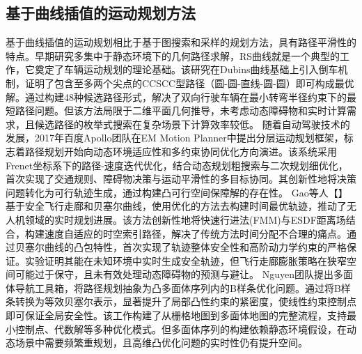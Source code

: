 \documentclass[master,academic]{ysuthesis} %
\begin{document}
		\subsection{基于曲线插值的运动规划方法}
		基于曲线插值的运动规划相比于基于图搜索和采样的规划方法，具有路径平滑性的特点。早期研究多集中于静态环境下的几何路径求解，RS曲线就是一个典型的工作，它奠定了车辆运动规划的理论基础。该研究在Dubins曲线基础上引入倒车机制，证明了包含至多两个尖点的CCSCC型路径（圆-圆-直线-圆-圆）即可构成最优解。通过构建48种候选路径形式，解决了双向行驶车辆在最小转弯半径约束下的最短路径问题。但该方法局限于二维平面几何推导，未考虑动态障碍物和实时计算需求，且候选路径的枚举式搜索在复杂场景下计算效率较低。 随着自动驾驶技术的发展，2017年百度Apollo团队在EM Motion Planner中提出分层运动规划框架，标志着路径规划开始向动态环境适应性和多约束协同优化方向演进。该系统采用Frenet坐标系下的路径-速度迭代优化，结合动态规划粗搜索与二次规划细优化，首次实现了交通规则、障碍物决策与运动平滑性的多目标协同。其创新性地将决策问题转化为可行轨迹生成，通过构建凸可行空间保障解的存在性。 Gao等人【】基于安全飞行走廊和贝塞尔曲线，使用优化的方法去构建时间最优轨迹，推动了无人机领域的实时规划进展。该方法创新性地将快速行进法(FMM)与ESDF距离场结合，构建速度自适应的时空索引路径，解决了传统方法时间分配不合理的痛点。通过贝塞尔曲线的凸包特性，首次实现了轨迹整体安全性和高阶动力学约束的严格保证。实验证明其能在未知环境中实时生成安全轨迹，但飞行走廊膨胀策略在狭窄空间可能过于保守，且未有效处理动态障碍物的预测与避让。 Nguyen团队提出多面体导航工具箱，将路径规划抽象为凸多面体序列内的B样条优化问题。通过将B样条转换为等效贝塞尔表示，显著提升了局部凸性约束的紧密度，使线性约束控制点即可保证全局安全性。该工作构建了从栅格地图到多面体地图的完整流程，支持最小控制点、代数解等多种优化模式。但多面体序列的构建依赖静态环境假设，在动态场景中需要频繁重规划，且高维凸优化问题的实时性仍有提升空间。
\end{document}
